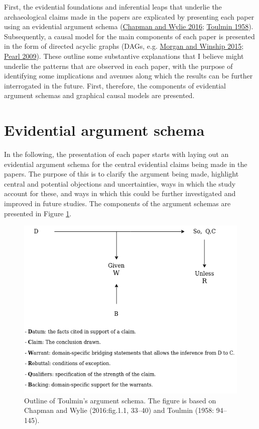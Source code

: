 \documentclass[
  12pt,
  a4paper,
  oneside]{book}
\begin{document}
First, the evidential foundations and inferential leaps that underlie the archaeological claims made in the papers are explicated by presenting each paper using an evidential argument schema (\protect\hyperlink{ref-chapman2016}{Chapman and Wylie 2016}; \protect\hyperlink{ref-toulmin1958}{Toulmin 1958}). Subsequently, a causal model for the main components of each paper is presented in the form of directed acyclic graphs (DAGs, e.g. \protect\hyperlink{ref-morgan2015}{Morgan and Winship 2015}; \protect\hyperlink{ref-pearl2009}{Pearl 2009}). These outline some substantive explanations that I believe might underlie the patterns that are observed in each paper, with the purpose of identifying some implications and avenues along which the results can be further interrogated in the future. First, therefore, the components of evidential argument schemas and graphical causal models are presented.

\hypertarget{evidential-argument-schema}{%
\section{Evidential argument schema}\label{evidential-argument-schema}}

In the following, the presentation of each paper starts with laying out an evidential argument schema for the central evidential claims being made in the papers. The purpose of this is to clarify the argument being made, highlight central and potential objections and uncertainties, ways in which the study account for these, and ways in which this could be further investigated and improved in future studies. The components of the argument schemas are presented in Figure \ref{fig:argument}.

\begin{figure}

{\centering \includegraphics[width=1\linewidth]{figures/argument_ex} 

}

\caption{Outline of Toulmin's argument schema. The figure is based on Chapman and Wylie (2016:fig.1.1, 33--40) and Toulmin (1958: 94--145).}\label{fig:argument}
\end{figure}
\end{document}

